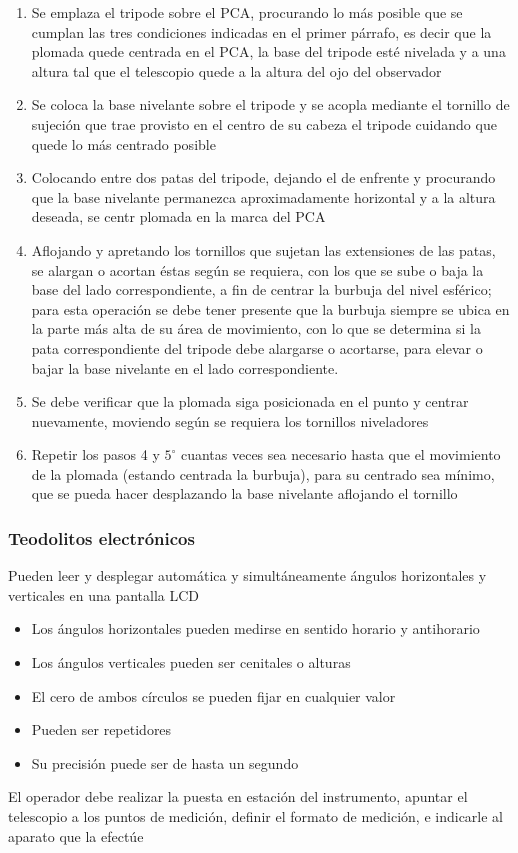 \begin{enumerate}
    \item Se emplaza el tripode sobre el PCA, procurando lo más posible que se cumplan las tres condiciones indicadas en el primer párrafo, es decir que la plomada quede centrada en el PCA, la base del tripode esté nivelada y a una altura tal que el telescopio quede a la altura del ojo del observador
    \item Se coloca la base nivelante sobre el tripode y se acopla mediante el tornillo de sujeción que trae provisto en el centro de su cabeza el tripode cuidando que quede lo más centrado posible
    \item Colocando entre dos patas del tripode, dejando el de enfrente y procurando que la base nivelante permanezca aproximadamente horizontal y a la altura deseada, se centr plomada en la marca del PCA
    \item Aflojando y apretando los tornillos que sujetan las extensiones de las patas, se alargan o acortan éstas según se requiera, con los que se sube o baja la base del lado correspondiente, a fin de centrar la burbuja del nivel esférico; para esta operación se debe tener presente que la burbuja siempre se ubica en la parte más alta de su área de movimiento, con lo que se determina si la pata correspondiente del tripode debe alargarse o acortarse, para elevar o bajar la base nivelante en el lado correspondiente.
    \item Se debe verificar que la plomada siga posicionada en el punto y centrar nuevamente, moviendo según se requiera los tornillos niveladores
    \item Repetir los pasos 4 y $5^{\circ}$ cuantas veces sea necesario hasta que el movimiento de la plomada (estando centrada la burbuja), para su centrado sea mínimo, que se pueda hacer desplazando la base nivelante aflojando el tornillo
\end{enumerate}

\subsubsection{Teodolitos electrónicos}

Pueden leer y desplegar automática y simultáneamente ángulos horizontales y verticales en una pantalla LCD
\begin{itemize}
    \item Los ángulos horizontales pueden medirse en sentido horario y antihorario
    \item Los ángulos verticales pueden ser cenitales  o alturas
    \item El cero de ambos círculos se pueden fijar en cualquier valor
    \item Pueden ser repetidores
    \item Su precisión puede ser de hasta un segundo
\end{itemize}
El operador debe realizar la puesta en estación del instrumento, apuntar el telescopio a los puntos de medición, definir el formato de medición, e indicarle al aparato que la efectúe

